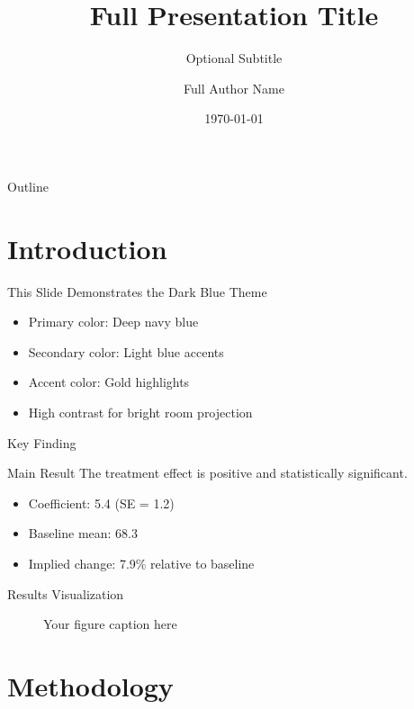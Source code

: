 \documentclass{beamer}
\title[Short Title]{Full Presentation Title}
\subtitle{Optional Subtitle}
\author[Author]{Full Author Name}
\institute[Inst]{University or Institution}
\date{\today}
\begin{document}
\begin{frame}
  \titlepage
\end{frame}

\begin{frame}{Outline}
  \tableofcontents
\end{frame}

\section{Introduction}

\begin{frame}{This Slide Demonstrates the Dark Blue Theme}
  \begin{itemize}
    \item Primary color: Deep navy blue
    \item Secondary color: Light blue accents
    \item Accent color: Gold highlights
    \item High contrast for bright room projection
  \end{itemize}
\end{frame}

\begin{frame}{Key Finding}
  \begin{block}{Main Result}
    The treatment effect is positive and statistically significant.
  \end{block}
  
  \begin{itemize}
    \item Coefficient: 5.4 (SE = 1.2)
    \item Baseline mean: 68.3
    \item Implied change: 7.9\% relative to baseline
  \end{itemize}
\end{frame}

\begin{frame}{Results Visualization}
  \begin{figure}
    \centering
    \caption{Your figure caption here}
  \end{figure}
\end{frame}

\section{Methodology}
\end{document}
